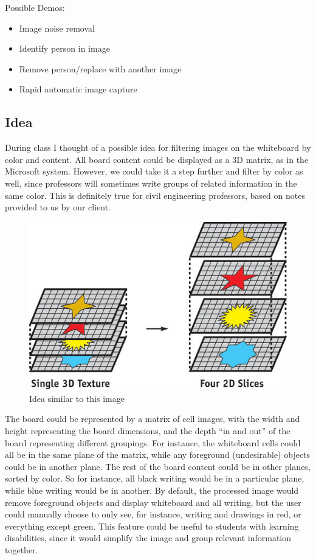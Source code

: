 \documentclass[]{article}
\begin{document}
	Possible Demos: 
	\begin{itemize}
	\item Image noise removal 
	\item Identify person in image
	\item Remove person/replace with another image
	\item Rapid automatic image capture
	\end{itemize}
	
		\subsection*{Idea}
	During class I thought of a possible idea for filtering images on the whiteboard by color and content.  All board content could be displayed as a 3D matrix, as in the Microsoft system.  However, we could take it a step further and filter by color as well, since professors will sometimes write groups of related information in the same color. This is definitely true for civil engineering professors, based on notes provided to us by our client. \\
\begin{figure}[H]
\centering
\includegraphics[scale=0.4]{images/3D_matrix}
\caption{Idea similar to this image}
\end{figure}	
	\indent The board could be represented by a matrix of cell images, with the width and height representing the board dimensions, and the depth ``in and out'' of the board representing different groupings.  For instance, the whiteboard cells could all be in the same plane of the matrix, while any foreground (undesirable) objects could be in another plane. The rest of the board content could be in other planes, sorted by color. So for instance, all black writing would be in a particular plane, while blue writing would be in another.  By default, the processed image would remove foreground objects and display whiteboard and all writing, but the user could manually choose to only see, for instance, writing and drawings in red, or everything except green.  This feature could be useful to students with learning disabilities, since it would simplify the image and group relevant information together.
\end{document}
